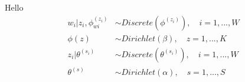 \documentclass[landscape,final]{baposter}
\begin{document}
\setlength{\bibspacing}{\baselineskip}

Hello
\begin{equation}
  \label{eq:dists}
  \begin{aligned}
    w_i|z_i, \phi_{wi}^{(z_i)} & \sim Discrete(\phi^{(z_i)}), \quad i = 1, ..., W \\
    \phi{(z)}  & \sim  Dirichlet(\beta), \quad z = 1, ..., K \\
    z_i | \theta^{(s_i)} & \sim  Discrete(\theta^{(s_i)}), \quad i = 1, ..., W \\
    \theta^{(s)} & \sim  Dirichlet(\alpha), \quad s = 1, ..., S \\
  \end{aligned}
\end{equation}
\end{document}
